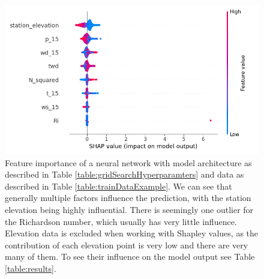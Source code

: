 \begin{figure}
    \centering
    \includegraphics[scale = 0.6]{Figures/shap_plots/summary_plot.png}
    \caption[Summary feature importance of a neural network.]{Feature importance of a neural network with model architecture as described in Table \ref{table:gridSearchHyperparamters} and data as described in Table \ref{table:trainDataExample}. We can see that generally multiple factors influence the prediction, with the station elevation being highly influential. There is seemingly one outlier for the Richardson number, which usually has very little influence. Elevation data is excluded when working with Shapley values, as the contribution of each elevation point is very low and there are very many of them. To see their influence on the model output see Table \ref{table:results}.}
    \label{fig:ShapleySummary}
\end{figure}

